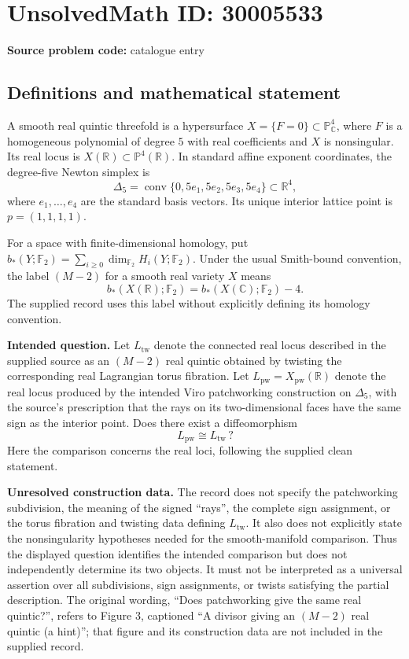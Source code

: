 \documentclass[11pt]{article}
\newcommand{\R}{\mathbb{R}}
\newcommand{\C}{\mathbb{C}}
\newcommand{\F}{\mathbb{F}}
\begin{document}
\section*{UnsolvedMath ID: 30005533}
\textbf{Source problem code:} catalogue entry
\subsection{Definitions and mathematical statement}
A smooth real quintic threefold is a hypersurface \(X=\{F=0\}\subset\mathbb P^4_{\C}\), where \(F\) is a homogeneous polynomial of degree \(5\) with real coefficients and \(X\) is nonsingular. Its real locus is \(X(\R)\subset\mathbb P^4(\R)\). In standard affine exponent coordinates, the degree-five Newton simplex is
\[
\Delta_5=\operatorname{conv}\{0,5e_1,5e_2,5e_3,5e_4\}\subset\R^4,
\]
where \(e_1,\ldots,e_4\) are the standard basis vectors. Its unique interior lattice point is \(p=(1,1,1,1)\).

For a space with finite-dimensional homology, put \(b_*(Y;\F_2)=\sum_{i\geq0}\dim_{\F_2}H_i(Y;\F_2)\). Under the usual Smith-bound convention, the label \((M-2)\) for a smooth real variety \(X\) means
\[
b_*(X(\R);\F_2)=b_*(X(\C);\F_2)-4.
\]
The supplied record uses this label without explicitly defining its homology convention.

\textbf{Intended question.} Let \(L_{\mathrm{tw}}\) denote the connected real locus described in the supplied source as an \((M-2)\) real quintic obtained by twisting the corresponding real Lagrangian torus fibration. Let \(L_{\mathrm{pw}}=X_{\mathrm{pw}}(\R)\) denote the real locus produced by the intended Viro patchworking construction on \(\Delta_5\), with the source's prescription that the rays on its two-dimensional faces have the same sign as the interior point. Does there exist a diffeomorphism
\[
L_{\mathrm{pw}}\cong L_{\mathrm{tw}}\,?
\]
Here the comparison concerns the real loci, following the supplied clean statement.

\textbf{Unresolved construction data.} The record does not specify the patchworking subdivision, the meaning of the signed ``rays'', the complete sign assignment, or the torus fibration and twisting data defining \(L_{\mathrm{tw}}\). It also does not explicitly state the nonsingularity hypotheses needed for the smooth-manifold comparison. Thus the displayed question identifies the intended comparison but does not independently determine its two objects. It must not be interpreted as a universal assertion over all subdivisions, sign assignments, or twists satisfying the partial description. The original wording, ``Does patchworking give the same real quintic?'', refers to Figure 3, captioned ``A divisor giving an \((M-2)\) real quintic (a hint)''; that figure and its construction data are not included in the supplied record.
\end{document}
